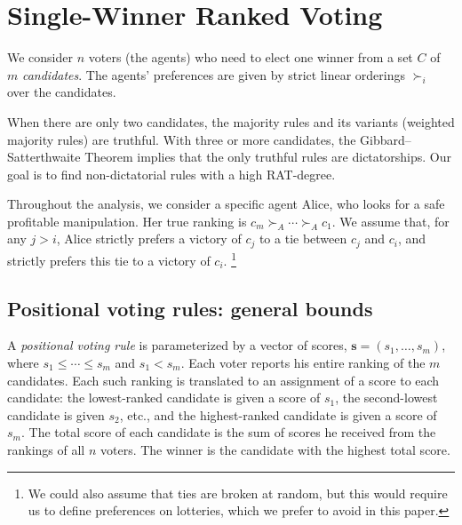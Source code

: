 \section{Single-Winner Ranked Voting}\label{sec:single-winner-voting}
We consider $n$ voters (the agents) who need to elect one winner from a set $C$ of $m$ \emph{candidates}.
The agents' preferences are given by strict linear orderings $\succ_i$ over the candidates.

When there are only two candidates, the majority rules and its variants (weighted majority rules)  are truthful.
With three or more candidates, the   Gibbard--Satterthwaite Theorem 
\cite{gibbard1973manipulation,satterthwaite1975strategy}
implies that the only truthful rules are dictatorships. 
Our goal is to find non-dictatorial rules with a high RAT-degree.


Throughout the analysis, we consider a specific agent Alice, who looks for a safe profitable manipulation. Her true ranking is $c_m \succ_A \cdots \succ_A c_1$.
We assume that, for any $j>i$, Alice strictly prefers a victory of $c_j$ to a tie between $c_j$ and $c_i$, and strictly prefers this tie to a victory of $c_i$.%
\footnote{We could also assume that ties are broken at random, but this would require us to define preferences on lotteries, which we prefer to avoid in this paper.}




\subsection{Positional voting rules: general bounds}
\newcommand{\scorevector}{\mathbf{s}}
\newcommand{\score}{\operatorname{score}}
A \emph{positional voting rule}
is parameterized by a vector of scores, $\scorevector=(s_1,\ldots,s_m)$, where $s_1\leq \cdots \leq  s_m$ and $s_1 < s_m$.
Each voter reports his entire ranking of the $m$ candidates. Each such ranking is translated to an assignment of a score to each candidate: the lowest-ranked candidate is given a score of $s_1$, the second-lowest candidate is given $s_2$, etc., and the highest-ranked candidate is given a score of $s_m$. 
The total score of each candidate is the sum of scores he received from the rankings of all $n$ voters. The winner is the candidate with the highest total score. 


